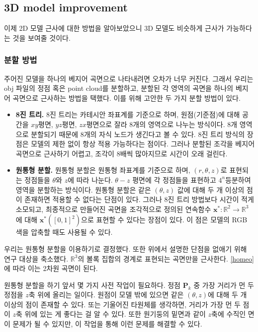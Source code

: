 \documentclass{gshs_thesis}
\theoremstyle{theorem}
\theoremstyle{lemma}
\theoremstyle{definition}
\begin{document}
\subsection{3D model improvement} \label{last research}
이제 2D 모델 근사에 대한 방법을 알아보았으니 3D 모델도 비슷하게 근사가 가능하다는 것을 보여줄 것이다. 
\subsubsection{분할 방법}
주어진 모델을 하나의 베지어 곡면으로 나타내려면 오차가 너무 커진다. 그래서 우리는 obj 파일의 정점 혹은 point cloud를 분할하고, 분할된 각 영역의 곡면을 하나의 베지어 곡면으로 근사하는 방법을 택했다. 이를 위해 고안한 두 가지 분할 방법이 있다. 
\begin{itemize}
	\item \textbf{8진 트리.} 8진 트리는 카테시안 좌표계를 기준으로 하며, 원점(기준점)에 대해 공간을 $xy$평면, $yz$평면, $zx$평면으로 잘라 8개의 영역으로 나누는 방식이다. 8개 영역으로 분할되기 때문에 8개의 자식 노드가 생긴다고 볼 수 있다. 8진 트리 방식의 장점은 모델의 제한 없이 항상 적용 가능하다는 점이다. 그러나 분할된 조각을 베지어 곡면으로 근사하기 어렵고, 조각이 8배씩 많아지므로 시간이 오래 걸린다.
	
	\item \textbf{원통형 분할.} 원통형 분할은 원통형 좌표계를 기준으로 하며, $(r, \theta, z)$로 표현되는 정점들을 $\theta$와 $z$에 따라 나눈다. $\theta-z$ 평면에 각 정점들을 표현하고 $4^n$등분하여 영역을 분할하는 방식이다. 원통형 분할은 같은 $(\theta, z)$ 값에 대해 두 개 이상의 점이 존재하면 적용할 수 없다는 단점이 있다. 그러나 8진 트리 방법보다 시간이 적게 소모되고, 최종적으로 만들어진 곡면을 조각적으로 정의된 연속함수 $\mathbf{x}^*\colon\mathbb{R}^2\to\mathbb{R}^3$에 대해 $\mathbf{x}^*([0, 1]^2)$으로 표현할 수 있다는 장점이 있다. 이 점은 모델의 RGB 색을 압축할 때도 사용될 수 있다. 
\end{itemize}
우리는 원통형 분할을 이용하기로 결정했다. 또한 위에서 설명한 단점을 없애기 위해 연구 대상을 축소했다. $\mathbb{R}^3$의 볼록 집합의 경계로 표현되는 곡면만을 근사한다. \cref{homeo}에 따라 이는 2차원 곡면이 된다. 

원통형 분할을 하기 앞서 몇 가지 사전 작업이 필요하다. 정점 $\mathbf{P}_k$ 중 가장 거리가 먼 두 정점을 $z$축 위에 올리는 일이다. 원점이 모델 밖에 있으면 같은 $(\theta, z)$에 대해 두 개 이상의 점이 존재할 수 있다. 또는 기울어진 타원체를 생각하면, 거리가 가장 먼 두 점이 $z$축 위에 있는 게 좋다는 걸 알 수 있다. 또한 원기둥의 밑면과 같이 $z$축에 수직인 면이 문제가 될 수 있지만, 이 작업을 통해 이런 문제를 해결할 수 있다. 
\end{document}
